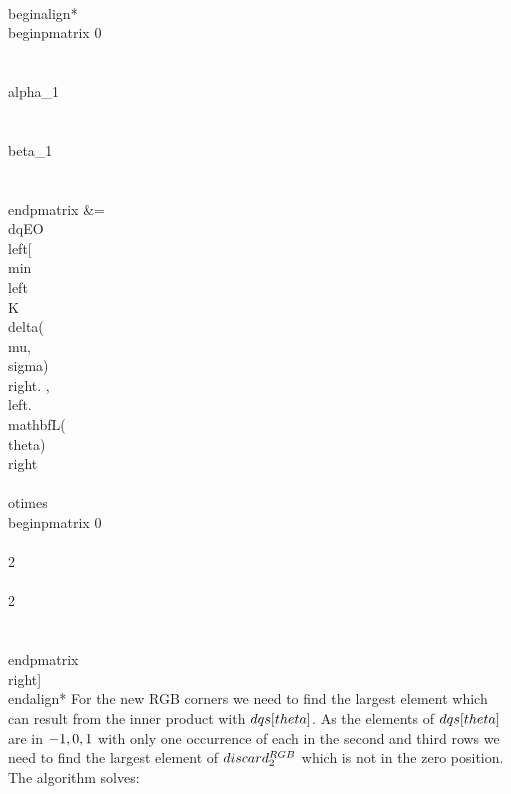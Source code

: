 \\begin{align*}
 \\begin{pmatrix}  0   \\\\   \\alpha_1   \\\\  \\beta_1   \\\\ \\end{pmatrix}     &=  
\\dqEO\\left[  \\min\\left\\{K \\delta(\\mu,\\sigma) \\right. ,  \\left. \\mathbf{L}(\\theta) \\right\\} 
 \\otimes 
        \\begin{pmatrix}  0   \\\\   2   \\\\  2    \\\\ \\end{pmatrix} \\right]
\\end{align*}
For the new RGB corners we need to find the largest element which can result from the inner product with $\\dqs[\\theta]$. As the elements of $\\dqs[\\theta]$ are in $\\{-1,0,1\\}$ with only one occurrence of each in the second and third rows we need to find the largest element of $\\discard^{RGB}_2$ which is not in the zero position. The algorithm solves:

